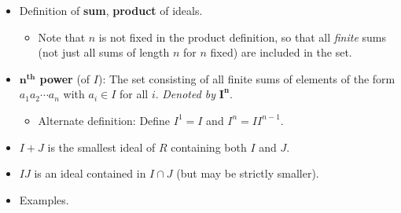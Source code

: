 \documentclass[../notes.tex]{subfiles}
\begin{document}
\begin{itemize}
\begin{theorem}
\begin{enumerate}[ref={\theproposition(\arabic*)}]
            \item \label{trm:7.8.2}(The Third Isomorphism Theorem for Rings) Let $I,J$ be ideals of $R$ with $I\subset J$. Then $J/I$ is an ideal of $R/I$ and $(R/I)/(J/I)\cong R/J$.
            \item \label{trm:7.8.3}(The Fourth Isomorphism Theorem for Rings) Let $I$ be an ideal of $R$. The correspondence $A\leftrightarrow A/I$ is an inclusion-preserving bijection between the set of subrings $A$ of $R$ that contain $I$ and the set of subrings of $R/I$. Furthermore, $A$ (a subring containing $I$) is an ideal of $R$ if and only if $A/I$ is an ideal of $R/I$.
        \end{enumerate}
        \begin{proof}
            All proofs follow the same structure: "First use the corresponding theorem from group theory to obtain an isomorphism of \emph{additive groups} (or correspondence of groups, in the case of the Fourth Isomorphism Theorem) and then check that this group isomorphism (or correspondence, respectively) is a multiplicative map, and so defines a \emph{ring} isomorphism. In each case the verification is immediate from the definition of multiplication in quotient rings" \parencite[246]{bib:DummitFoote}.
        \end{proof}
    \end{theorem}
    \item Definition of \textbf{sum}, \textbf{product} of ideals.
    \begin{itemize}
        \item Note that $n$ is not fixed in the product definition, so that all \emph{finite} sums (not just all sums of length $n$ for $n$ fixed) are included in the set.
    \end{itemize}
    \item \textbf{$\bm{n}^\textbf{th}$ power} (of $I$): The set consisting of all finite sums of elements of the form $a_1a_2\cdots a_n$ with $a_i\in I$ for all $i$. \emph{Denoted by} $\bm{I^n}$.
    \begin{itemize}
        \item Alternate definition: Define $I^1=I$ and $I^n=II^{n-1}$.
    \end{itemize}
    \item $I+J$ is the smallest ideal of $R$ containing both $I$ and $J$.
    \item $IJ$ is an ideal contained in $I\cap J$ (but may be strictly smaller).
    \item Examples.
    \begin{enumerate}

\end{enumerate}
\end{itemize}
\end{document}
